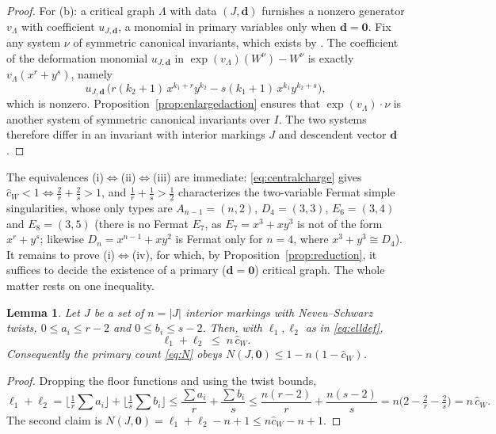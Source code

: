 \documentclass[11pt]{amsart}
\newtheorem{lemma}[theorem]{Lemma}
\theoremstyle{definition}
\theoremstyle{remark}
\newcommand{\chat}{\hat{c}}
\begin{document}
\begin{proof}
For (b): a critical graph $\Lambda$ with data $(J,\mathbf d)$ furnishes a
nonzero generator $v_{\Lambda}$ with coefficient $u_{J,\mathbf d}$, a monomial
in primary variables only when $\mathbf d=\mathbf 0$. Fix any system
$\nu$ of symmetric canonical invariants, which exists by
\cite[Theorem~0.1]{GKT}. The coefficient of the deformation monomial
$u_{J,\mathbf d}$ in
$\exp(v_{\Lambda})(W^{\nu})-W^{\nu}$ is exactly
$v_{\Lambda}(x^{r}+y^{s})$, namely
\[
u_{J,\mathbf d}\,\bigl(r(k_{2}+1)\,x^{k_{1}+r}y^{k_{2}}
-s(k_{1}+1)\,x^{k_{1}}y^{k_{2}+s}\bigr),
\]
which is nonzero. Proposition~\ref{prop:enlargedaction} ensures that
$\exp(v_{\Lambda})\cdot\nu$ is another system of symmetric canonical invariants
over $I$. The two systems therefore differ in an invariant with interior
markings $J$ and descendent vector $\mathbf d$.
\end{proof}


The equivalences (i)$\Leftrightarrow$(ii)$\Leftrightarrow$(iii) are immediate:
\eqref{eq:centralcharge} gives $\chat_{W}<1\Leftrightarrow\frac2r+\frac2s>1$, and
$\frac1r+\frac1s>\frac12$ characterizes the two-variable Fermat simple
singularities, whose only types are $A_{n-1}=(n,2)$, $D_{4}=(3,3)$,
$E_{6}=(3,4)$ and $E_{8}=(3,5)$ (there is no Fermat $E_{7}$, as $E_{7}=x^{3}+xy^{3}$
is not of the form $x^{r}+y^{s}$; likewise $D_{n}=x^{n-1}+xy^{2}$ is Fermat only
for $n=4$, where $x^{3}+y^{3}\cong D_{4}$). It remains to prove
(i)$\Leftrightarrow$(iv), for which, by Proposition~\ref{prop:reduction}, it
suffices to decide the existence of a primary ($\mathbf d=\mathbf0$) critical
graph. The whole matter rests on one inequality.

\begin{lemma}
\label{lem:bound}
Let $J$ be a set of $n=|J|$ interior markings with Neveu--Schwarz twists,
$0\leq a_{i}\leq r-2$ and $0\leq b_{i}\leq s-2$. Then, with $\ell_{1},\ell_{2}$
as in \eqref{eq:elldef},
\[
\ell_{1}+\ell_{2}\;\leq\;n\,\chat_{W}.
\]
Consequently the primary count \eqref{eq:N} obeys
$N(J,\mathbf 0)\leq 1-n(1-\chat_{W})$.
\end{lemma}

\begin{proof}
Dropping the floor functions and using the twist bounds,
\[
\ell_{1}+\ell_{2}
=\Big\lfloor\tfrac1r\textstyle\sum a_{i}\Big\rfloor
+\Big\lfloor\tfrac1s\textstyle\sum b_{i}\Big\rfloor
\leq\frac{\sum a_{i}}{r}+\frac{\sum b_{i}}{s}
\leq\frac{n(r-2)}{r}+\frac{n(s-2)}{s}
=n\Big(2-\tfrac2r-\tfrac2s\Big)=n\,\chat_{W}.
\]
The second claim is $N(J,\mathbf 0)=\ell_{1}+\ell_{2}-n+1\leq n\chat_{W}-n+1$.
\end{proof}
\end{document}
